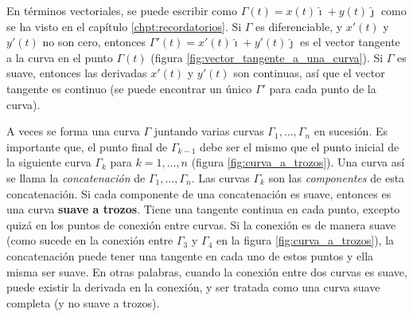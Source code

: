 En términos vectoriales, se puede escribir como $\Gamma(t)=x(t)\hat{\imath} + y(t)\hat{\jmath}$ como se ha visto en el capítulo \ref{chpt:recordatorios}. Si $\Gamma$ es diferenciable, y $x'(t)$ y $y'(t)$ no son cero, entonces $\Gamma'(t)=x'(t)\hat{\imath}+y'(t)\hat{\jmath}$ es el vector tangente a la curva en el punto $\Gamma(t)$ (figura \ref{fig:vector_tangente_a_una_curva}). Si $\Gamma$ es suave, entonces las derivadas $x'(t)$ y $y'(t)$ son continuas, así que el vector tangente es continuo (se puede encontrar un único $\Gamma'$ para cada punto de la curva).



A veces se forma una curva $\Gamma$ juntando varias curvas $\Gamma_1,\dots, \Gamma_n$ en sucesión. Es importante que, el punto final de $\Gamma_{k-1}$ debe ser el mismo que el punto inicial de la siguiente curva $\Gamma_k$ para $k=1,\dots,n$ (figura \ref{fig:curva_a_trozos}). Una curva así se llama la \textit{concatenación} de $\Gamma_1,\dots,\Gamma_n$. Las curvas $\Gamma_k$ son las \textit{componentes} de esta concatenación. Si cada componente de una concatenación es suave, entonces es una curva \textbf{suave a trozos}. Tiene una tangente continua en cada punto, excepto quizá en los puntos de conexión entre curvas. Si la conexión es de manera suave (como sucede en la conexión entre $\Gamma_3$ y $\Gamma_4$ en la figura \ref{fig:curva_a_trozos}), la concatenación puede tener una tangente en cada uno de estos puntos y ella misma ser suave. En otras palabras, cuando la conexión entre dos curvas es suave, puede existir la derivada en la conexión, y ser tratada como una curva suave completa (y no suave a trozos).
